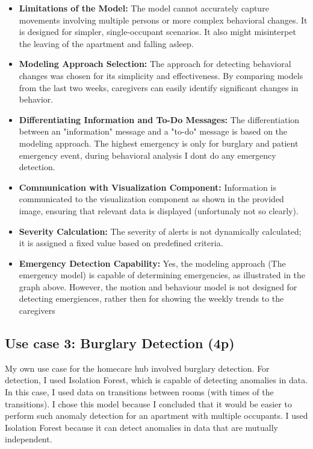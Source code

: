 \documentclass[A4,10pt]{article}
\begin{document}
\begin{itemize}
	\item \textbf{Limitations of the Model:} The model cannot accurately capture movements involving multiple persons or more complex behavioral changes. It is designed for simpler, single-occupant scenarios. It also might misinterpet the leaving of the apartment and falling asleep.
	\item \textbf{Modeling Approach Selection:} The approach for detecting behavioral changes was chosen for its simplicity and effectiveness. By comparing models from the last two weeks, caregivers can easily identify significant changes in behavior.
	\item \textbf{Differentiating Information and To-Do Messages:} The differentiation between an "information" message and a "to-do" message is based on the modeling approach. The highest emergency is only for burglary and patient emergency event, during behavioral analysis I dont do any emergency detection.
	\item \textbf{Communication with Visualization Component:} Information is communicated to the visualization component as shown in the provided image, ensuring that relevant data is displayed (unfortunaly not so clearly).
	\item \textbf{Severity Calculation:} The severity of alerts is not dynamically calculated; it is assigned a fixed value based on predefined criteria.
	\item \textbf{Emergency Detection Capability:} Yes, the modeling approach (The emergency model) is capable of determining emergencies, as illustrated in the graph above. However, the motion and behaviour model is not designed for detecting emergiences, rather then for showing the weekly trends to the caregivers
\end{itemize}


\subsection{ Use case 3: Burglary Detection (4p)}

My own use case for the homecare hub involved burglary detection. For detection, I used Isolation Forest, which is capable of detecting anomalies in data. In this case, I used data on transitions between rooms (with times of the transitions). I chose this model because I concluded that it would be easier to perform such anomaly detection for an apartment with multiple occupants. I used Isolation Forest because it can detect anomalies in data that are mutually independent.
\end{document}

